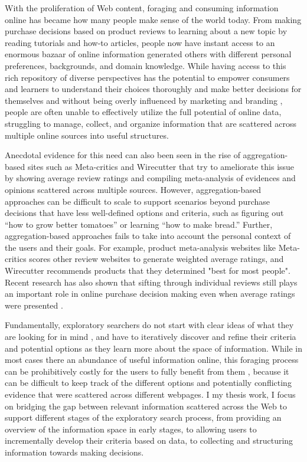 


With the proliferation of Web content, foraging and consuming information online has became how many people make sense of the world today. From making purchase decisions based on product reviews to learning about a new topic by reading tutorials and how-to articles, people now have instant access to an enormous bazaar of online information generated others with different personal preferences, backgrounds, and domain knowledge. While having access to this rich repository of diverse perspectives has the potential to empower consumers and learners to understand their choices thoroughly and make better decisions for themselves and without being overly influenced by marketing and branding \cite{de2015navigating}, people are often unable to effectively utilize the full potential of online data, struggling to manage, collect, and organize information that are scattered across multiple online sources into useful structures.

Anecdotal evidence for this need can also been seen in the rise of aggregation-based sites such as Meta-critics and Wirecutter that try to ameliorate this issue by showing average review ratings and compiling meta-analysis of evidences and opinions scattered across multiple sources. However, aggregation-based approaches can be difficult to scale to support scenarios beyond purchase decisions that have less well-defined options and criteria, such as figuring out ``how to grow better tomatoes'' or learning ``how to make bread.''
Further, aggregation-based approaches fails to take into account the personal context of the users and their goals. For example, product meta-analysis websites like Meta-critics scores other review websites to generate weighted average ratings, and Wirecutter recommends products that they determined "best for most people". Recent research has also shown that sifting through individual reviews still plays an important role in online purchase decision making even when average ratings were presented \cite{mudambi2010research,gan2012helpfulness}.

Fundamentally, exploratory searchers do not start with clear ideas of what they are looking for in mind \cite{mar2006exp}, and have to iteratively discover and refine their criteria and potential options as they learn more about the space of information. While in most cases there an abundance of useful information online, this foraging process can be prohibitively costly for the users to fully benefit from them \cite{pirolli1999information,pirolli2005sensemaking}, because it can be difficult to keep track of the different options and potentially conflicting evidence that were scattered across different webpages. I my thesis work, I focus on bridging the gap between relevant information scattered across the Web to support different stages of the exploratory search process, from providing an overview of the information space in early stages, to allowing users to incrementally develop their criteria based on data, to collecting and structuring information towards making decisions.

